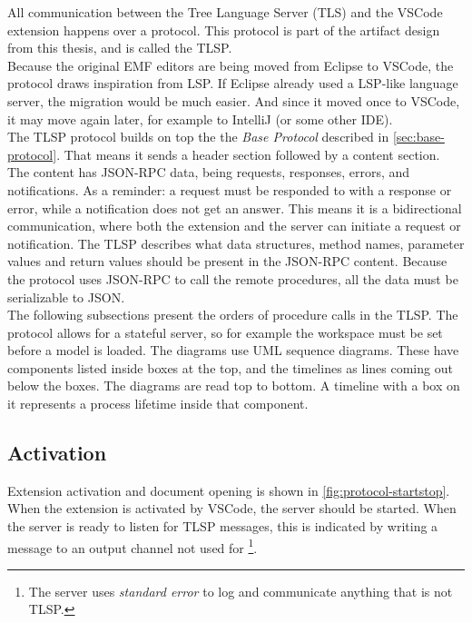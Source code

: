 \newcommand{\bluearrowDesc}{The blue half-arrow ($\rightharpoondown$) is part of the \acrfull{TLSP}.}

All communication between the Tree Language Server (TLS) and the \gls{VSCode} extension happens over a protocol.
This protocol is part of the artifact design from this thesis, and is called the \acrlong{TLSP}.\\

Because the original \acrshort{EMF} editors are being moved from \gls{Eclipse} to \gls{VSCode}, the protocol draws inspiration from \acrlong{LSP}.
If \gls{Eclipse} already used a \acrshort{LSP}-like language server, the migration would be much easier.
And since it moved once to \gls{VSCode}, it may move again later, for example to IntelliJ (or some other \acrshort{IDE}).\\

The TLSP protocol builds on top the the \textit{Base Protocol} described in \cref{sec:base-protocol}.
That means it sends a header section followed by a content section.
The content has \gls{JSON-RPC} data, being requests, responses, errors, and notifications.
As a reminder: a request must be responded to with a response or error, while a notification does not get an answer.
This means it is a bidirectional communication, where both the extension and the server can initiate a request or notification.
The \acrshort{TLSP} describes what data structures, method names, parameter values and return values should be present in the \gls{JSON-RPC} content.
Because the protocol uses \gls{JSON-RPC} to call the remote procedures, all the data must be serializable to \gls{JSON}.\\

The following subsections present the orders of procedure calls in the \acrshort{TLSP}.
The protocol allows for a stateful server, so for example the workspace must be set before a model is loaded.
The diagrams use UML sequence diagrams.
These have components listed inside boxes at the top, and the timelines as lines coming out below the boxes.
The diagrams are read top to bottom.
A timeline with a box on it represents a process lifetime inside that component.

\subsection{Activation}

Extension activation and document opening is shown in \cref{fig:protocol-startstop}.
When the extension is activated by \gls{VSCode}, the server should be started.
When the server is ready to listen for \acrshort{TLSP} messages, this is indicated by writing a message to an output channel not used for \footnote{The server uses \textit{standard error} to log and communicate anything that is not \acrshort{TLSP}.}.\\

